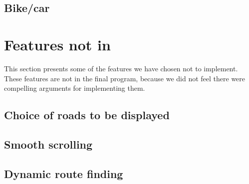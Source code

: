 \subsection{Bike/car}
\label{UIA-IF-BC}

\section{Features not in}
\label{UIA-NF}
This section presents some of the features we have chosen not to implement.
These features are not in the final program, because we did not feel there were
compelling arguments for implementing them.
\subsection{Choice of roads to be displayed}
\label{UIA-NF-CRD}
\subsection{Smooth scrolling}
\label{UIA-NF-SS}
\subsection{Dynamic route finding}
\label{UIA-NF-DRF}
